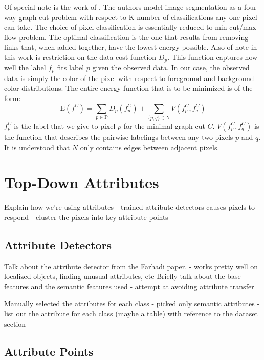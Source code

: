 \documentclass[10pt,twocolumn,letterpaper]{article}
\begin{document}
Of special note is the work of \cite{Boykov2001}.  The authors model image segmentation as a four-way graph cut problem with respect to K number of classifications any one pixel can take.  The choice of pixel classification is essentially reduced to min-cut/max-flow problem.  The optimal classification is the one that results from removing links that, when added together, have the lowest energy possible.  Also of note in this work is restriction on the data cost function  $D_p$.  This function captures how well the label $f_p$ fits label $p$ given the observed data.  In our case, the observed data is simply the color of the pixel with respect to foreground and background color distributions. The entire energy function that is to be minimized is of the form:
\begin{equation}
\textrm{E}(f^C)  =  \sum_{p \in \textrm{P}}{D_p(\textrm{$f^C_p$}) } + \sum_{\{p,q\} \in \textrm{N}}{V(f^C_p,f^C_q)}
\label{eq:energy}
\end{equation}
$f^C_p$ is the label that we give to pixel $p$ for the minimal graph cut $C$.  $V(f^C_p,f^C_q)$ is the function that describes the pairwise labelings between any two pixels $p$ and $q$.  It is understood that $N$ only contains edges between adjacent pixels.

\section{Top-Down Attributes}

Explain how we're using attributes
- trained attribute detectors causes pixels to respond
- cluster the pixels into key attribute points


\subsection{Attribute Detectors}

Talk about the attribute detector from the Farhadi paper.
- works pretty well on localized objects, finding unusual attributes, etc
Briefly talk about the base features and the semantic features used
- attempt at avoiding attribute transfer

Manually selected the attributes for each class
- picked only semantic attributes
- list out the attribute for each class (maybe a table) with reference to the dataset section


\subsection{Attribute Points}
\end{document}
